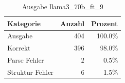 
\begin{table}[!ht]
\centering
\begin{tabular}{lrr}
\toprule
\textbf{Kategorie} & \textbf{Anzahl} & \textbf{Prozent} \\
\midrule
Ausgabe & 404 & 100.0\% \\
Korrekt & 396 & 98.0\% \\
Parse Fehler & 2 & 0.5\% \\
Struktur Fehler & 6 & 1.5\% \\
\bottomrule
\end{tabular}
\caption{Ausgabe llama3_70b_ft_9}
\label{tab:file_counts}
\end{table}
    